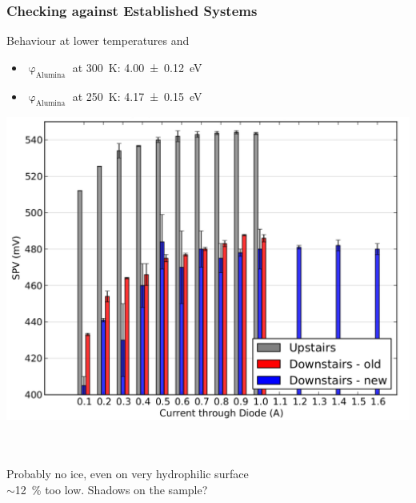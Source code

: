 \documentclass{beamer}
\begin{document}
\begin{frame}
\frametitle{Checking against Established Systems}
\begin{block}{Behaviour at lower temperatures and \spv{}}
\centering
\begin{minipage}{0.4\linewidth}
	\begin{itemize}
		\item $\upvarphi_{\text{Alumina}}$ at \SI{300}{\kelvin}: \SI{4.00+-0.12}{\electronvolt}
		\item $\upvarphi_{\text{Alumina}}$ at \SI{250}{\kelvin}: \SI{4.17+-0.15}{\electronvolt}
	\end{itemize}
\end{minipage}
\hfill
\begin{minipage}{0.55\linewidth}
\centering
	\includegraphics[width=1\linewidth]{./figs/pres/currentseries}
\end{minipage}\\[5pt]\hrulefill\\
Probably no ice, even on very hydrophilic surface\\
\spv{} $\sim$\SI{12}{\percent} too low. Shadows on the sample?
\end{block}\end{frame}
\end{document}
